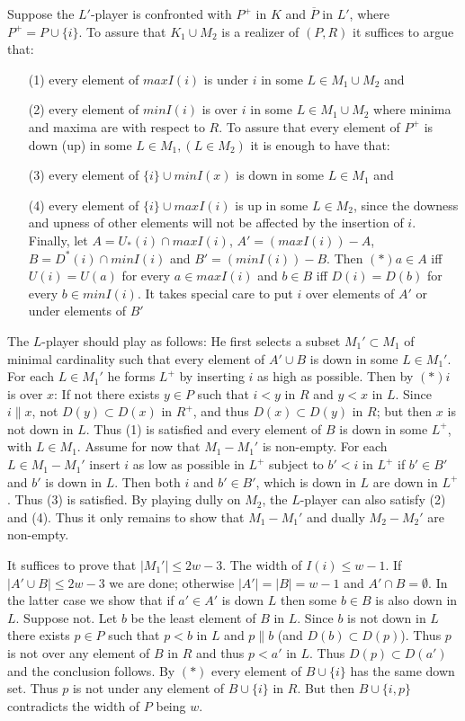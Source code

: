 \documentclass[twoside]{article}
\begin{document}
Suppose the $L'$-player is confronted with $P^+$ in $K$ and $\overline{P}$ in $L'$,
where $P^+ = P \cup \{i\}$. To assure that $K_1 \cup M_2$ is a realizer of $(P,R)$ it
suffices to argue that:
\begin{itemize}
  \item[(1)] every element of $max I(i)$ is under $i$ in some $L \in M_1 \cup M_2$ and
  \item[(2)] every element of $min I(i)$ is over $i$ in some $L \in M_1 \cup M_2$ where minima and maxima are
  with respect to $R$. To assure that every element of $P^+$ is down (up) in some
  $L \in M_1, (L \in M_2)$ it is enough to have that:
  \item[(3)] every element of $\{i\} \cup min I(x)$ is down in some $L \in M_1$ and
  \item[(4)] every element of $\{i\} \cup max I(i)$ is up in some $L \in M_2$, since the
  downess and upness of other elements will not be affected by the insertion of $i$. Finally, let
  $A=U_*(i) \cap max I(i)$, $A'=(max I(i)) - A$, $B=D^*(i) \cap min I(i)$ and $B'=(min I(i))-B$.
  Then $(*) a \in A$ iff $U(i) = U(a)$ for every $a \in max I(i)$ and $b \in B$ iff $D(i) = D(b)$
  for every $b \in min I(i)$. It takes special care to put $i$ over elements of $A'$ or under
  elements of $B'$
\end{itemize}
%
%

The $L$-player should play as follows: He first selects a subset $M_1' \subset M_1$ of minimal
cardinality such that every element of $A' \cup B$ is down in some $L \in M_1'$. For each
$L \in M_1'$ he forms $L^+$ by inserting $i$ as high as possible. Then by $(*) i$ is over $x$:
If not there exists $y \in P$ such that $i<y$ in $R$ and $y<x$ in $L$. Since $i \parallel x$,
not $D(y) \subset D(x)$ in $R^+$, and thus $D(x) \subset D(y)$ in $R$; but then $x$ is not down
in $L$. Thus (1) is satisfied and every element of $B$ is down in some $L^+$, with $L \in M_1$.
Assume for now that $M_1 - M_1'$ is non-empty. For each $L \in M_1 - M_1'$ insert $i$ as low as
possible in $L^+$ subject to $b' < i$ in $L^+$ if $b' \in B'$ and $b'$ is down in $L$.
Then both $i$ and $b'\in B'$, which is down in $L$ are down in $L^+$. Thus (3) is satisfied.
By playing dully on $M_2$, the $L$-player can also satisfy (2) and (4). Thus it only remains
to show that $M_1 -M_1'$ and dually $M_2-M_2'$ are non-empty.

It suffices to prove that $|M_1'| \leq 2w-3$. The width of $I(i)\leq w-1$. If
$|A'\cup B| \leq 2w-3$ we are done; otherwise $|A'|=|B|=w-1$ and $A' \cap B = \emptyset$.
In the latter case we show that if $a' \in A'$ is down $L$ then some $b \in B$ is also 
down in $L$. Suppose not. Let $b$ be the least element of $B$ in $L$. Since $b$ is not down in $L$ there
exists $p \in P$ such that $p<b$ in $L$ and $p \parallel b$ (and $D(b) \subset D(p)$). Thus
$p$ is not over any element of $B$ in $R$ and thus $p<a'$ in $L$. Thus $D(p) \subset D(a')$ and
the conclusion follows. By $(*)$ every element of $B \cup \{i\}$ has the same down set. Thus $p$ is not under any element of
$B \cup \{i\}$ in $R$. But then $B \cup \{i,p\}$ contradicts the width of $P$ being $w$.
\end{document}
